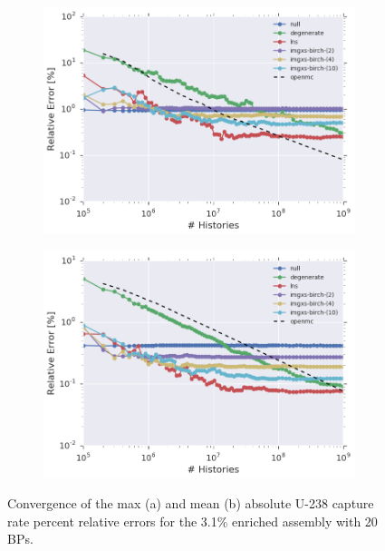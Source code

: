 \begin{figure}[h!]
\centering
\begin{subfigure}{\textwidth}
  \centering
  \includegraphics[width=0.9\linewidth]{figures/results/convergence/assm-31-20BPs/max-capt-err-evo}
  \caption{}
  \label{fig:chap11-assm-3.1-20BPs-capture-converge-max}
\end{subfigure}
\begin{subfigure}{\textwidth}
  \centering
  \includegraphics[width=0.9\linewidth]{figures/results/convergence/assm-31-20BPs/mean-capt-err-evo}
  \caption{}
  \label{fig:chap11-assm-3.1-20BPs-capture-converge-mean}
\end{subfigure}
\vspace{2mm}
\caption[U-238 capture rate error convergence with MC histories]{Convergence of the max (a) and mean (b) absolute U-238 capture rate percent relative errors for the 3.1\% enriched assembly with 20 \acp{BP}.}
\label{fig:chap11-assm-3.1-20BPs-capture-converge}
\end{figure}

